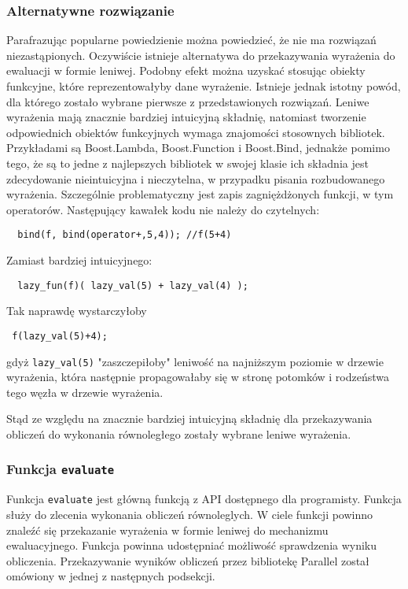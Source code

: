 \subsubsection{Alternatywne rozwiązanie}

  Parafrazując popularne powiedzienie można powiedzieć, że nie ma rozwiązań niezastąpionych.
  Oczywiście istnieje alternatywa do przekazywania wyrażenia do ewaluacji w formie leniwej.
  Podobny efekt można uzyskać stosując obiekty funkcyjne, które reprezentowałyby dane wyrażenie.
  Istnieje jednak istotny powód, dla którego zostało wybrane pierwsze z przedstawionych rozwiązań.
  Leniwe wyrażenia mają znacznie bardziej intuicyjną składnię, natomiast tworzenie odpowiednich obiektów funkcyjnych wymaga znajomości stosownych bibliotek.
  Przykładami są Boost.Lambda, Boost.Function i Boost.Bind, jednakże pomimo tego, że są to jedne z najlepszych bibliotek w swojej klasie ich składnia jest zdecydowanie nieintuicyjna i nieczytelna, w przypadku pisania rozbudowanego wyrażenia.
  Szczególnie problematyczny jest zapis zagniężdżonych funkcji, w tym operatorów.
  Następujący kawałek kodu nie należy do czytelnych:
\begin{verbatim}
  bind(f, bind(operator+,5,4)); //f(5+4)
\end{verbatim}
  Zamiast bardziej intuicyjnego:
\begin{verbatim}
  lazy_fun(f)( lazy_val(5) + lazy_val(4) );
\end{verbatim}
  Tak naprawdę wystarczyłoby
\begin{verbatim}
 f(lazy_val(5)+4);
\end{verbatim}
  gdyż \verb|lazy_val(5)| "zaszczepiłoby" leniwość na najniższym poziomie w drzewie wyrażenia, która następnie propagowałaby się w stronę potomków i rodzeństwa tego węzła w drzewie wyrażenia.

  Stąd ze względu na znacznie bardziej intuicyjną składnię dla przekazywania obliczeń do wykonania równoległego zostały wybrane leniwe wyrażenia.
  
\subsubsection{Funkcja \texttt{evaluate}}

  Funkcja \texttt{evaluate} jest główną funkcją z API dostępnego dla programisty.
  Funkcja służy do zlecenia wykonania obliczeń równoleglych.
  W ciele funkcji powinno znaleźć się przekazanie wyrażenia w formie leniwej do mechanizmu ewaluacyjnego.
  Funkcja powinna udostępniać możliwość sprawdzenia wyniku obliczenia.
  Przekazywanie wyników obliczeń przez bibliotekę Parallel został omówiony w jednej z następnych podsekcji.
  
